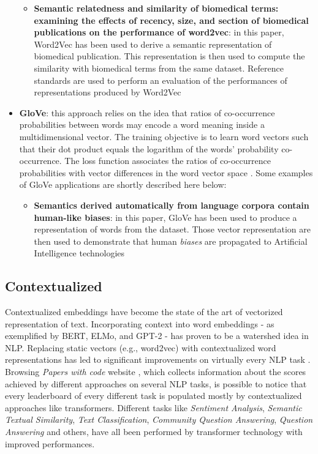 \documentclass[\main/main.tex]{subfiles}
\begin{document}
\begin{itemize}
\begin{itemize}
\begin{itemize}
        \end{itemize}
        \cite{Song2020SentenceSC}
        \item \textbf{Semantic relatedness and similarity of biomedical terms: examining the effects of recency, size, and section of biomedical publications on the performance of word2vec}: in this paper, Word2Vec has been used to derive a semantic representation of biomedical publication. This representation is then used to compute the similarity with biomedical terms from the same dataset. Reference standards are used to perform an evaluation of the performances of representations produced by Word2Vec \cite{Zhu2017SemanticRA}  
    \end{itemize}
    
    \item \textbf{GloVe}: this approach relies on the idea that ratios of co-occurrence probabilities between words may encode a word meaning inside a multidimensional vector. The training objective is to learn word vectors such that their dot product equals the logarithm of the words' probability co-occurrence. The loss function associates the ratios of co-occurrence probabilities with vector differences in the word vector space \cite{pennington2014glove}.
    Some examples of GloVe applications are shortly described here below:
    \begin{itemize}
        \item \textbf{Semantics derived automatically from language corpora contain human-like biases}: in this paper, GloVe has been used to produce a representation of words from the dataset. Those vector representation are then used to demonstrate that human \emph{biases} are propagated to Artificial Intelligence technologies \cite{Caliskan2017SemanticsDA}
    \end{itemize}
\end{itemize}
\subsection{Contextualized}
Contextualized embeddings have become the state of the art of vectorized representation of text. Incorporating context into word embeddings - as exemplified by BERT, ELMo, and GPT-2 - has proven to be a watershed idea in NLP. Replacing static vectors (e.g., word2vec) with contextualized word representations has led to significant improvements on virtually every NLP task \cite{stanford_contextualized_blog_post}. Browsing \emph{Papers with code} website \cite{paperswithcode}, which collects information about the scores achieved by different approaches on several NLP tasks, is possible to notice that every leaderboard of every different task is populated mostly by contextualized approaches like transformers. Different tasks like \emph{Sentiment Analysis}\cite{paperswithcode_sa}, \emph{Semantic Textual Similarity}\cite{paperswithcode_sts}, \emph{Text Classification}\cite{paperswithcode_tc}, \emph{Community Question Answering}\cite{paperswithcode_cqa}, \emph{Question Answering}\cite{paperswithcode_qa} and others, have all been performed by transformer technology with improved performances.
\end{document}

